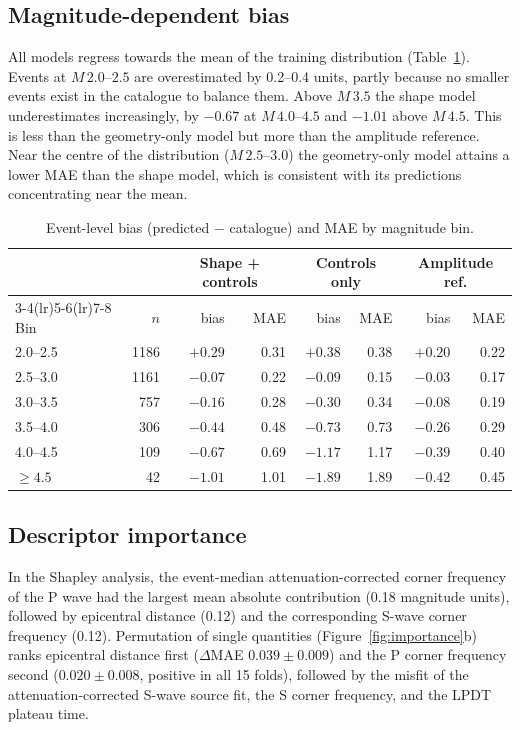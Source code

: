 \documentclass[11pt,a4paper]{article}
\begin{document}
\subsection{Magnitude-dependent bias}
All models regress towards the mean of the training distribution
(Table~\ref{tab:bias}). Events at $M\,2.0$--$2.5$ are
overestimated by 0.2--0.4 units, partly because no smaller events exist in the
catalogue to balance them. Above $M\,3.5$ the shape model underestimates
increasingly, by $-0.67$ at $M\,4.0$--$4.5$ and $-1.01$ above $M\,4.5$. This
is less than the geometry-only model but more than the amplitude reference.
Near the centre of the distribution ($M\,2.5$--$3.0$) the geometry-only model
attains a lower MAE than the shape model, which is consistent with its
predictions concentrating near the mean.

\begin{table}[ht]
  \centering\small
  \caption{Event-level bias (predicted $-$ catalogue) and MAE by magnitude bin.}
  \label{tab:bias}
  \begin{tabular}{lrrrrrrr}
    \toprule
    & & \multicolumn{2}{c}{Shape + controls} & \multicolumn{2}{c}{Controls only} & \multicolumn{2}{c}{Amplitude ref.} \\
    \cmidrule(lr){3-4}\cmidrule(lr){5-6}\cmidrule(lr){7-8}
    Bin & $n$ & bias & MAE & bias & MAE & bias & MAE \\
    \midrule
    2.0--2.5 & 1186 & $+0.29$ & 0.31 & $+0.38$ & 0.38 & $+0.20$ & 0.22 \\
    2.5--3.0 & 1161 & $-0.07$ & 0.22 & $-0.09$ & 0.15 & $-0.03$ & 0.17 \\
    3.0--3.5 & 757 & $-0.16$ & 0.28 & $-0.30$ & 0.34 & $-0.08$ & 0.19 \\
    3.5--4.0 & 306 & $-0.44$ & 0.48 & $-0.73$ & 0.73 & $-0.26$ & 0.29 \\
    4.0--4.5 & 109 & $-0.67$ & 0.69 & $-1.17$ & 1.17 & $-0.39$ & 0.40 \\
    $\geq 4.5$ & 42 & $-1.01$ & 1.01 & $-1.89$ & 1.89 & $-0.42$ & 0.45 \\
    \bottomrule
  \end{tabular}
\end{table}

\subsection{Descriptor importance}
In the Shapley analysis, the event-median attenuation-corrected corner
frequency of the P wave had the largest mean absolute contribution (0.18
magnitude units), followed by epicentral distance (0.12) and the
corresponding S-wave corner frequency (0.12). Permutation of single
quantities (Figure~\ref{fig:importance}b) ranks epicentral distance first
($\Delta$MAE $0.039\pm0.009$) and the P corner frequency second ($0.020\pm0.008$,
positive in all 15 folds), followed by the misfit of the attenuation-corrected
S-wave source fit, the S corner frequency, and the LPDT plateau time.
\end{document}

